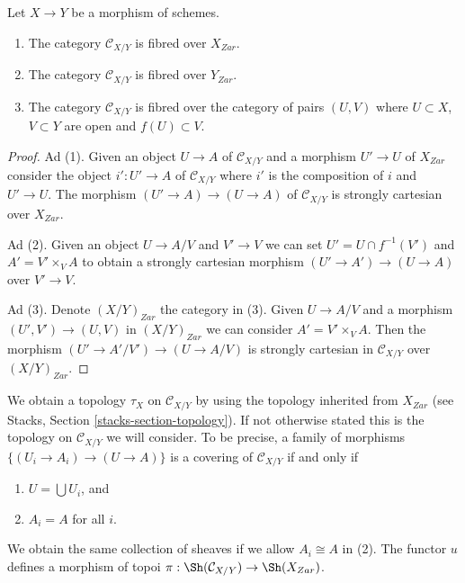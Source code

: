 \begin{lemma}
\label{lemma-category-fibred}
Let $X \to Y$ be a morphism of schemes.
\begin{enumerate}
\item The category $\mathcal{C}_{X/Y}$ is fibred over $X_{Zar}$.
\item The category $\mathcal{C}_{X/Y}$ is fibred over $Y_{Zar}$.
\item The category $\mathcal{C}_{X/Y}$ is fibred over the
category of pairs $(U, V)$ where $U \subset X$, $V \subset Y$ are
open and $f(U) \subset V$.
\end{enumerate}
\end{lemma}

\begin{proof}
Ad (1). Given an object $U \to A$ of $\mathcal{C}_{X/Y}$ and a morphism
$U' \to U$ of $X_{Zar}$ consider the object $i' : U' \to A$ of
$\mathcal{C}_{X/Y}$ where $i'$ is the composition of $i$ and $U' \to U$.
The morphism $(U' \to A) \to (U \to A)$ of $\mathcal{C}_{X/Y}$
is strongly cartesian over $X_{Zar}$.

\medskip\noindent
Ad (2). Given an object $U \to A/V$ and $V' \to V$ we can set
$U' = U \cap f^{-1}(V')$ and $A' = V' \times_V A$ to obtain a strongly
cartesian morphism $(U' \to A') \to (U \to A)$ over $V' \to V$.

\medskip\noindent
Ad (3). Denote $(X/Y)_{Zar}$ the category in (3). Given $U \to A/V$
and a morphism $(U', V') \to (U, V)$ in $(X/Y)_{Zar}$ we can consider
$A' = V' \times_V A$. Then the morphism $(U' \to A'/V') \to (U \to A/V)$
is strongly cartesian in $\mathcal{C}_{X/Y}$ over $(X/Y)_{Zar}$.
\end{proof}

\noindent
We obtain a topology $\tau_X$ on $\mathcal{C}_{X/Y}$ by
using the topology inherited from $X_{Zar}$ (see
Stacks, Section \ref{stacks-section-topology}). If not otherwise
stated this is the topology on $\mathcal{C}_{X/Y}$ we will consider.
To be precise, a family of morphisms $\{(U_i \to A_i) \to (U \to A)\}$
is a covering of $\mathcal{C}_{X/Y}$ if and only if
\begin{enumerate}
\item $U = \bigcup U_i$, and
\item $A_i = A$ for all $i$.
\end{enumerate}
We obtain the same collection of sheaves if we allow $A_i \cong A$ in (2).
The functor $u$ defines a morphism of topoi
$\pi : \Sh(\mathcal{C}_{X/Y}) \to \Sh(X_{Zar})$.

